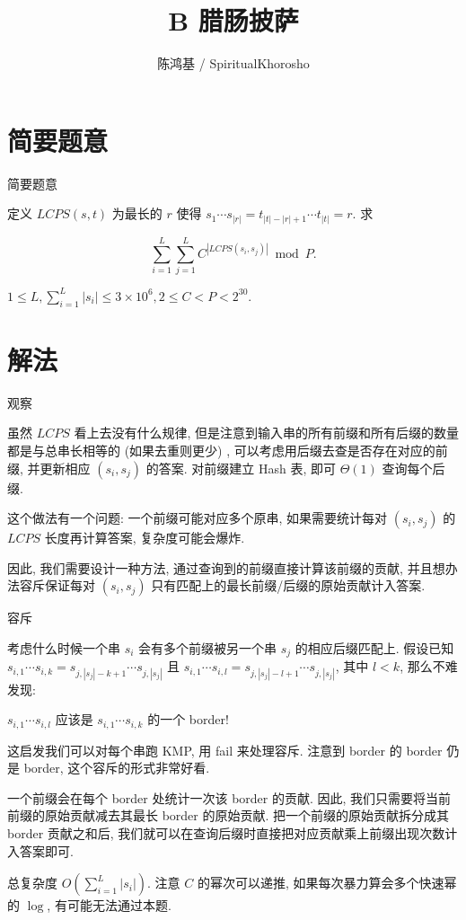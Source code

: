 \documentclass[utf8,usenames,dvipsnames]{beamer}
\author{陈鸿基 / SpiritualKhorosho}
\title{B 腊肠披萨}
\institute{Tsinghua University}
\begin{document}
\begin{frame}
	\titlepage
\end{frame}

\section{简要题意}

\begin{frame}{简要题意}
	
	定义 $LCPS\left(s, t\right)$ 为最长的 $r$ 使得 $s_1 \cdots s_{|r|} = t_{|t| - |r| + 1} \cdots t_{|t|} = r$. 求

	$$\sum_{i=1}^L \sum_{j=1}^L C^{\left|LCPS\left(s_i, s_j\right)\right|} \bmod{P}.$$

	$1\le L, \sum_{i=1}^L \left|s_i\right|\le 3\times 10^6, 2\le C < P < 2^{30}$.

\end{frame}

\section{解法}

\begin{frame}{观察}
	
	虽然 $LCPS$ 看上去没有什么规律, 但是注意到输入串的所有前缀和所有后缀的数量都是与总串长相等的 (如果去重则更少) , 可以考虑用后缀去查是否存在对应的前缀, 并更新相应 $\left(s_i, s_j\right)$ 的答案. 对前缀建立 Hash 表, 即可 $\Theta(1)$ 查询每个后缀. 

	这个做法有一个问题: 一个前缀可能对应多个原串, 如果需要统计每对 $\left(s_i, s_j\right)$ 的 $LCPS$ 长度再计算答案, 复杂度可能会爆炸. 

	因此, 我们需要设计一种方法, 通过查询到的前缀直接计算该前缀的贡献, 并且想办法容斥保证每对 $\left(s_i, s_j\right)$ 只有匹配上的最长前缀/后缀的原始贡献计入答案. 

\end{frame}

\begin{frame}{容斥}
	
	考虑什么时候一个串 $s_i$ 会有多个前缀被另一个串 $s_j$ 的相应后缀匹配上. 假设已知 $s_{i,1}\cdots s_{i,k} = s_{j,\left|s_j\right|-k+1}\cdots s_{j, \left|s_j\right|}$ 且 $s_{i,1}\cdots s_{i,l} = s_{j,\left|s_j\right|-l+1}\cdots s_{j, \left|s_j\right|}$, 
	其中 $l<k$, 那么不难发现:\pause

	$s_{i,1}\cdots s_{i,l}$ 应该是 $s_{i,1}\cdots s_{i,k}$ 的一个 border!

	这启发我们可以对每个串跑 KMP, 用 fail 来处理容斥. 注意到 border 的 border 仍是 border, 这个容斥的形式非常好看. 

	一个前缀会在每个 border 处统计一次该 border 的贡献. 因此, 我们只需要将当前前缀的原始贡献减去其最长 border 的原始贡献. 把一个前缀的原始贡献拆分成其 border 贡献之和后, 我们就可以在查询后缀时直接把对应贡献乘上前缀出现次数计入答案即可. 
	
	总复杂度 $O\left(\sum_{i=1}^L \left|s_i\right|\right)$. 注意 $C$ 的幂次可以递推, 如果每次暴力算会多个快速幂的 $\log$, 有可能无法通过本题. 

\end{frame}
\end{document}

